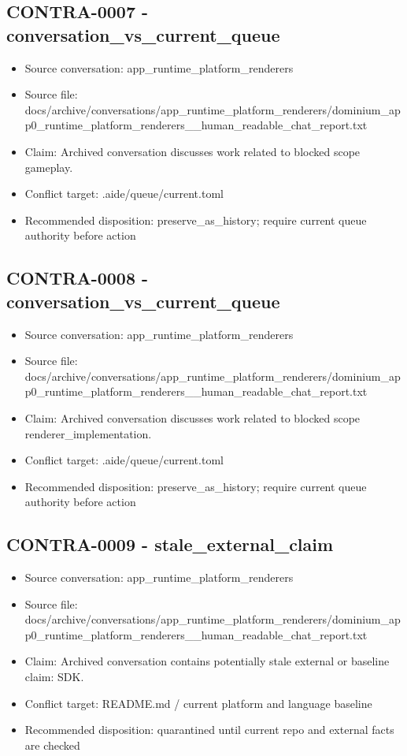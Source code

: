 \documentclass[11pt,a4paper]{report}
\begin{document}
\subsection{CONTRA-0007 - conversation\_vs\_current\_queue}

\begin{itemize}
\item Source conversation: app\_runtime\_platform\_renderers
\item Source file: docs/archive/conversations/app\_runtime\_platform\_renderers/dominium\_app0\_runtime\_platform\_renderers\_\_human\_readable\_chat\_report.txt
\item Claim: Archived conversation discusses work related to blocked scope gameplay.
\item Conflict target: .aide/queue/current.toml
\item Recommended disposition: preserve\_as\_history; require current queue authority before action
\end{itemize}

\subsection{CONTRA-0008 - conversation\_vs\_current\_queue}

\begin{itemize}
\item Source conversation: app\_runtime\_platform\_renderers
\item Source file: docs/archive/conversations/app\_runtime\_platform\_renderers/dominium\_app0\_runtime\_platform\_renderers\_\_human\_readable\_chat\_report.txt
\item Claim: Archived conversation discusses work related to blocked scope renderer\_implementation.
\item Conflict target: .aide/queue/current.toml
\item Recommended disposition: preserve\_as\_history; require current queue authority before action
\end{itemize}

\subsection{CONTRA-0009 - stale\_external\_claim}

\begin{itemize}
\item Source conversation: app\_runtime\_platform\_renderers
\item Source file: docs/archive/conversations/app\_runtime\_platform\_renderers/dominium\_app0\_runtime\_platform\_renderers\_\_human\_readable\_chat\_report.txt
\item Claim: Archived conversation contains potentially stale external or baseline claim: SDK.
\item Conflict target: README.md / current platform and language baseline
\item Recommended disposition: quarantined until current repo and external facts are checked
\end{itemize}
\end{document}

